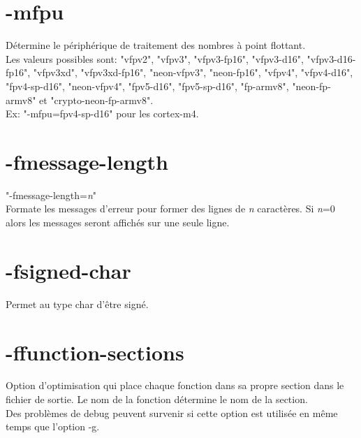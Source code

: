\documentclass[headings=appendixprefix]{scrreprt}
\begin{document}

\section{-mfpu}

Détermine le périphérique de traitement des nombres à point flottant.\\

Les valeurs possibles sont: "vfpv2", "vfpv3", "vfpv3-fp16", "vfpv3-d16", "vfpv3-d16-fp16", "vfpv3xd", "vfpv3xd-fp16", "neon-vfpv3", "neon-fp16", "vfpv4", "vfpv4-d16", "fpv4-sp-d16", "neon-vfpv4", "fpv5-d16", "fpv5-sp-d16", "fp-armv8", "neon-fp-armv8" et "crypto-neon-fp-armv8".\\

Ex: "-mfpu=fpv4-sp-d16" pour les cortex-m4.\\


\newpage
\section{-fmessage-length}

"-fmessage-length=\textit{n}"\\
Formate les messages d'erreur pour former des lignes de \textit{n} caractères. Si \textit{n}=0 alors les messages seront affichés sur une seule ligne.\\


\section{-fsigned-char}

Permet au type char d'être signé.\\


\section{-ffunction-sections}

Option d'optimisation qui place chaque fonction dans sa propre section dans le fichier de sortie. Le nom de la fonction détermine le nom de la section.\\

Des problèmes de debug peuvent survenir si cette option est utilisée en même temps que l'option -g.\\
\end{document}
